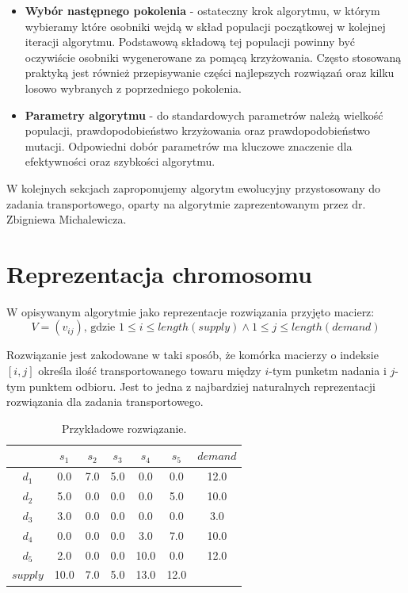 \begin{itemize}
    [TODO: przyklad]

    \item \textbf{Wybór następnego pokolenia} - ostateczny krok algorytmu, w którym wybieramy które osobniki wejdą w skład populacji początkowej w 
    kolejnej iteracji algorytmu. Podstawową składową tej populacji powinny być oczywiście osobniki wygenerowane za pomącą krzyżowania. Często 
    stosowaną praktyką jest również przepisywanie części najlepszych rozwiązań oraz kilku losowo wybranych z poprzedniego pokolenia. 

    \item \textbf{Parametry algorytmu} - do standardowych parametrów należą wielkość populacji, prawdopodobieństwo krzyżowania oraz prawdopodobieństwo 
    mutacji. Odpowiedni dobór parametrów ma kluczowe znaczenie dla efektywności oraz szybkości algorytmu.

\end{itemize}

W kolejnych sekcjach zaproponujemy algorytm ewolucyjny przystosowany do zadania transportowego, oparty na algorytmie zaprezentowanym przez 
dr. Zbigniewa Michalewicza\cite{ALG-GEN-BOOK}.


\section{Reprezentacja chromosomu}
W opisywanym algorytmie jako reprezentacje rozwiązania przyjęto macierz:
$$V = (v_{ij}) \text{, gdzie } 1 \le i \le length(supply) \land 1 \le j \le length(demand)$$

Rozwiązanie jest zakodowane w taki sposób, że komórka macierzy o indeksie $[i, j]$ określa ilość transportowanego towaru 
między $i$-tym punketm nadania i $j$-tym punktem odbioru. Jest to jedna z najbardziej naturalnych reprezentacji rozwiązania 
dla zadania transportowego.

\begin{table}[h!]
    \begin{center}
        \begin{tabular}{c||ccccc||c}
              & $s_1$ & $s_2$ & $s_3$ & $s_4$ & $s_5$ & $demand$ \\ 
            \hline
            \hline
            $d_1$ & 0.0 & 7.0 & 5.0 & 0.0 & 0.0 & 12.0 \\
            $d_2$ & 5.0 & 0.0 & 0.0 & 0.0 & 5.0 & 10.0 \\
            $d_3$ & 3.0 & 0.0 & 0.0 & 0.0 & 0.0 & 3.0 \\
            $d_4$ & 0.0 & 0.0 & 0.0 & 3.0 & 7.0 & 10.0 \\
            $d_5$ & 2.0 & 0.0 & 0.0 & 10.0 & 0.0 & 12.0 \\
            \hline
            \hline
            $supply$ & 10.0 & 7.0 & 5.0 & 13.0 & 12.0 & \\ 
        \end{tabular}
    \end{center}
    \caption{Przykładowe rozwiązanie.}
\end{table}

